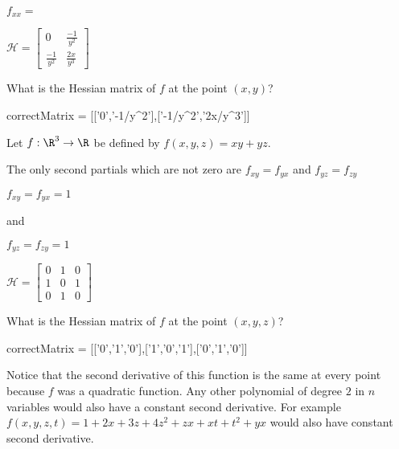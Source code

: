 \documentclass{ximera}
\begin{document}
\begin{question}
\begin{solution}
\begin{hint}
\begin{question}
\begin{solution}
\begin{hint}
\begin{align*}
 							\end{align*}
 						\end{hint}
 							$f_{xx}=$
 						\end{solution}
 					\end{question}
 				\end{hint}
 		\begin{hint}
 					\(\mathcal{H} = \begin{bmatrix} 0 & \frac{-1}{y^2}\\ \frac{-1}{y^2} &  \frac{2x}{y^3} \end{bmatrix} \)
 				\end{hint}
 		What is the Hessian matrix of $f$ at the point $(x,y)$?
 			\begin{matrix-answer}
 				correctMatrix = [['0','-1/y^2'],['-1/y^2','2x/y^3']]
 			\end{matrix-answer}
 	\end{solution}
 \end{question}
 
 \begin{question}
 	Let $f:\R^3 \to \R$ be defined by $f(x,y,z) = xy+yz$.
 	\begin{solution}
 		\begin{hint}
 			The only second partials which are not zero are $f_{xy} = f_{yx}$ and $f_{yz} =f_{zy}$
 		\end{hint}
 		\begin{hint}
 			$f_{xy} = f_{yx} = 1$
 			
 			and
 		
 			$f_{yz} = f_{zy} = 1$
 		\end{hint}
 		\begin{hint}	
 			\(\mathcal{H} = \begin{bmatrix} 0 & 1&0\\1&0&1\\0&1&0\end{bmatrix}\)
 		\end{hint}
 		What is the Hessian matrix of $f$ at the point $(x,y,z)$?
 			\begin{matrix-answer}
 				correctMatrix = [['0','1','0'],['1','0','1'],['0','1','0']]
 			\end{matrix-answer}
 	\end{solution}
 		Notice that the second derivative of this function is the same at every point because $f$ was a quadratic function.  Any other polynomial of
 		degree $2$ in $n$ variables would also have a constant second derivative. For example $f(x,y,z,t) = 1+2x+3z+4z^2+zx+xt+t^2+yx$ would also have
 		constant second derivative.
 \end{question}
 
%
\end{document}
